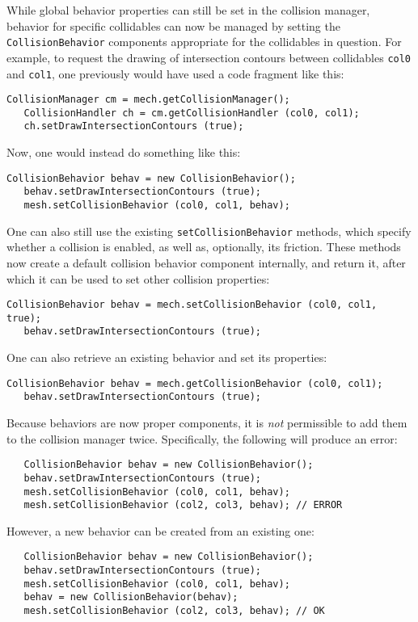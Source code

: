 \documentclass{article}
\begin{document}
While global behavior properties can still be set in the collision
manager, behavior for specific collidables can now be managed by
setting the {\tt CollisionBehavior} components appropriate for the
collidables in question. For example, to request the drawing of
intersection contours between collidables {\tt col0} and {\tt col1},
one previously would have used a code fragment like this:
%
\begin{lstlisting}[]
   CollisionManager cm = mech.getCollisionManager();
   CollisionHandler ch = cm.getCollisionHandler (col0, col1);
   ch.setDrawIntersectionContours (true);   
\end{lstlisting}
%
Now, one would instead do something like this:
%
\begin{lstlisting}[]
   CollisionBehavior behav = new CollisionBehavior();
   behav.setDrawIntersectionContours (true); 
   mesh.setCollisionBehavior (col0, col1, behav);
\end{lstlisting}
%
One can also still use the existing {\tt setCollisionBehavior}
methods, which specify whether a collision is enabled, as well as,
optionally, its friction. These methods now create a default collision
behavior component internally, and return it, after which
it can be used to set other collision properties:
%
\begin{lstlisting}[]
   CollisionBehavior behav = mech.setCollisionBehavior (col0, col1, true);
   behav.setDrawIntersectionContours (true); 
\end{lstlisting}
%
One can also retrieve an existing behavior and set its
properties:
%
\begin{lstlisting}[]
   CollisionBehavior behav = mech.getCollisionBehavior (col0, col1);
   behav.setDrawIntersectionContours (true); 
\end{lstlisting}
%
\begin{sideblock}
Because behaviors are now proper components, it is {\it not}
permissible to add them to the collision manager twice. Specifically,
the following will produce an error:
\begin{verbatim}
   CollisionBehavior behav = new CollisionBehavior();
   behav.setDrawIntersectionContours (true); 
   mesh.setCollisionBehavior (col0, col1, behav);
   mesh.setCollisionBehavior (col2, col3, behav); // ERROR
\end{verbatim}
However, a new behavior can be created from an existing one:
\begin{verbatim}
   CollisionBehavior behav = new CollisionBehavior();
   behav.setDrawIntersectionContours (true); 
   mesh.setCollisionBehavior (col0, col1, behav);
   behav = new CollisionBehavior(behav);
   mesh.setCollisionBehavior (col2, col3, behav); // OK
\end{verbatim}
\end{sideblock}
\end{document}
